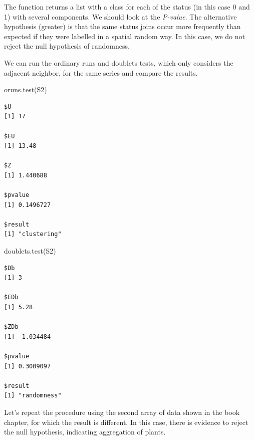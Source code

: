 \documentclass[
  letterpaper,
  DIV=11,
  numbers=noendperiod]{scrreprt}
\newenvironment{Shaded}{\begin{snugshade}}{\end{snugshade}}
\newcommand{\FunctionTok}[1]{\textcolor[rgb]{0.28,0.35,0.67}{#1}}
\newcommand{\NormalTok}[1]{\textcolor[rgb]{0.00,0.23,0.31}{#1}}
\begin{document}
The function returns a list with a class for each of the status (in this
case 0 and 1) with several components. We should look at the
\emph{P-value}. The alternative hypothesis (greater) is that the same
status joins occur more frequently than expected if they were labelled
in a spatial random way. In this case, we do not reject the null
hypothesis of randomness.

We can run the ordinary runs and doublets tests, which only considers
the adjacent neighbor, for the same series and compare the results.

\begin{Shaded}
\begin{Highlighting}[]
\FunctionTok{oruns.test}\NormalTok{(S2)}
\end{Highlighting}
\end{Shaded}

\begin{verbatim}
$U
[1] 17

$EU
[1] 13.48

$Z
[1] 1.440688

$pvalue
[1] 0.1496727

$result
[1] "clustering"
\end{verbatim}

\begin{Shaded}
\begin{Highlighting}[]
\FunctionTok{doublets.test}\NormalTok{(S2)}
\end{Highlighting}
\end{Shaded}

\begin{verbatim}
$Db
[1] 3

$EDb
[1] 5.28

$ZDb
[1] -1.034484

$pvalue
[1] 0.3009097

$result
[1] "randomness"
\end{verbatim}

Let's repeat the procedure using the second array of data shown in the
book chapter, for which the result is different. In this case, there is
evidence to reject the null hypothesis, indicating aggregation of
plants.
\end{document}
